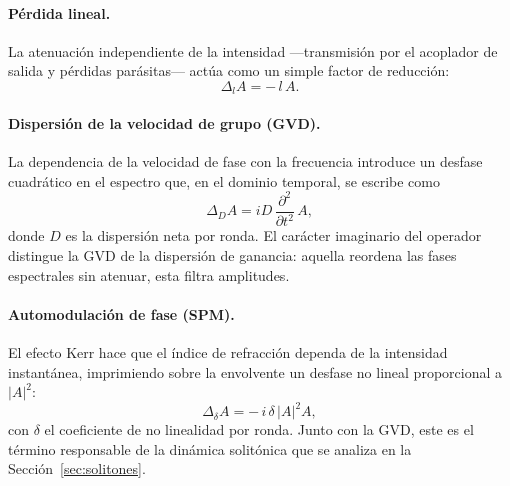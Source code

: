\paragraph{Pérdida lineal.}
La atenuación independiente de la intensidad —transmisión por el acoplador de
salida y pérdidas parásitas— actúa como un simple factor de reducción:
%
\begin{equation}
    \Delta_{l} A = -\,l\,A .
    \label{eq:op_perdida}
\end{equation}
 
\paragraph{Dispersión de la velocidad de grupo (GVD).}
La dependencia de la velocidad de fase con la frecuencia introduce un desfase
cuadrático en el espectro que, en el dominio temporal, se escribe como
%
\begin{equation}
    \Delta_{D} A = i D\,\frac{\partial^2}{\partial t^2}\,A ,
    \label{eq:op_gvd}
\end{equation}
%
donde $D$ es la dispersión neta por ronda. El carácter imaginario del operador
distingue la GVD de la dispersión de ganancia: aquella reordena las fases
espectrales sin atenuar, esta filtra amplitudes.
 
\paragraph{Automodulación de fase (SPM).}
El efecto Kerr hace que el índice de refracción dependa de la intensidad
instantánea, imprimiendo sobre la envolvente un desfase no lineal proporcional a
$|A|^2$:
%
\begin{equation}
    \Delta_{\delta} A = -\,i\,\delta\,|A|^2 A ,
    \label{eq:op_spm}
\end{equation}
%
con $\delta$ el coeficiente de no linealidad por ronda. Junto con la GVD, este es
el término responsable de la dinámica solitónica que se analiza en la
Sección~\ref{sec:solitones}.
 
